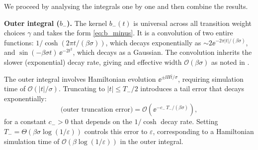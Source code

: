 We proceed by analysing the integrals one by one and then combine the results.

\medskip
\noindent\textbf{Outer integral ($b_-$).}
The kernel $b_-(t)$ is universal across all transition weight choices $\gamma$ and takes the form \eqref{eq:b_minus}. It is a convolution of two entire functions: $1/\cosh(2\pi t / (\beta\sigma))$, which decays exponentially as $\sim 2\ee^{-2\pi |t| / (\beta\sigma)}$, and $\sin(-\beta\sigma t)\,\ee^{-2t^2}$, which decays as a Gaussian. The convolution inherits the slower (exponential) decay  rate, giving and effective width $\mathcal{O}(\beta\sigma)$ as noted in \cite[footnote 13]{chen2023efficient}.

The outer integral involves Hamiltonian evolution $\ee^{\pm \ii H \bar{t} / \sigma}$, requiring simulation time of $\mathcal{O}(|t| / \sigma)$. Truncating to $|t| \leq T_-  / 2$ introduces a tail error that decays exponentially:
\begin{equation}
    \text{(outer truncation error)} = \mathcal{O}\!\left(\ee^{-c_-\, T_- / (\beta\sigma)}\right),
\end{equation}
for a constant $c_- > 0$ that depends on the $1/\cosh$ decay rate. Setting $T_- = \Theta(\beta\sigma\log(1/\varepsilon))$ controls this error to $\varepsilon$, corresponding to a Hamiltonian simulation time of $\mathcal{O}(\beta\log(1/\varepsilon))$ in the outer integral.

